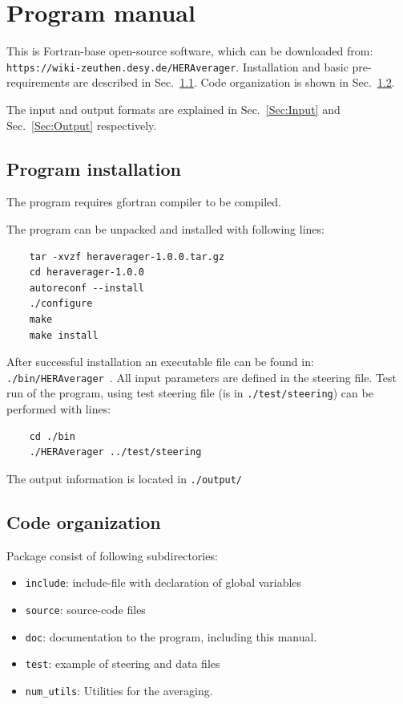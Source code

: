 \section{Program manual}
\label{Sec.FortranProgram}

This is Fortran-base open-source software, which can be downloaded from: {\tt https://wiki-zeuthen.desy.de/HERAverager}. Installation and basic pre-requirements are described in Sec.~\ref{Sec:Install}. Code organization is shown in Sec.~\ref{Sec:Code}.

The input and output formats are explained in Sec.~\ref{Sec:Input} and Sec.~\ref{Sec:Output} respectively.

\subsection{Program installation}
\label{Sec:Install}
The program requires gfortran compiler to be compiled.

The program can be unpacked and installed with following lines:
\begin{verbatim}
    tar -xvzf heraverager-1.0.0.tar.gz
    cd heraverager-1.0.0
    autoreconf --install
    ./configure
    make 
    make install
\end{verbatim}

After successful installation an executable file can be found in: {\tt ./bin/HERAverager }. All input parameters are defined in the steering file. Test run of the program, using test steering file (is in {\tt ./test/steering}) can be performed with lines:

\begin{verbatim}
    cd ./bin
    ./HERAverager ../test/steering
\end{verbatim}

The output information is located in {\tt ./output/}

\subsection{Code organization}
\label{Sec:Code}

Package consist of following subdirectories:

\begin{itemize}
\item {\tt include}: include-file with declaration of global variables
\item {\tt source}: source-code files
\item {\tt doc}: documentation to the program, including this manual.
\item {\tt test}: example of steering and data files
\item {\tt num\_utils}: Utilities for the averaging.
\end{itemize}


